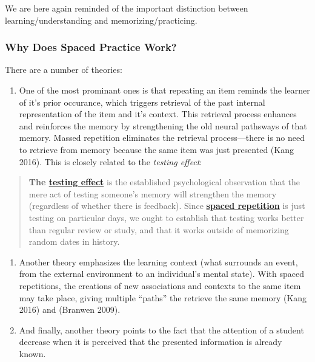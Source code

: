 We are here again reminded of the important distinction between
learning/understanding and memorizing/practicing.

\subsubsection{Why Does Spaced Practice
Work?}\label{why-does-spaced-practice-work}

There are a number of theories:

\begin{enumerate}
\def\labelenumi{\arabic{enumi}.}
\tightlist
\item
  One of the most prominant ones is that repeating an item reminds the
  learner of it's prior occurance, which triggers retrieval of the past
  internal representation of the item and it's context. This retrieval
  process enhances and reinforces the memory by strengthening the old
  neural pathsways of that memory. Massed repetition eliminates the
  retrieval process---there is no need to retrieve from memory because
  the same item was just presented (Kang 2016). This is closely related
  to the \emph{testing effect}:
\end{enumerate}

\begin{quote}
\textbf{The
\href{https://en.wikipedia.org/wiki/testing\%20effect}{testing effect}}
is the established psychological observation that the mere act of
testing someone's memory will strengthen the memory (regardless of
whether there is feedback). Since
\href{https://en.wikipedia.org/wiki/spaced\%20repetition}{\textbf{spaced
repetition}} is just testing on particular days, we ought to establish
that testing works better than regular review or study, and that it
works outside of memorizing random dates in history.
\end{quote}

\begin{enumerate}
\def\labelenumi{\arabic{enumi}.}
\setcounter{enumi}{1}
\tightlist
\item
  Another theory emphasizes the learning context (what surrounds an
  event, from the external environment to an individual's mental state).
  With spaced repetitions, the creations of new associations and
  contexts to the same item may take place, giving multiple ``paths''
  the retrieve the same memory (Kang 2016) and (Branwen 2009).
\item
  And finally, another theory points to the fact that the attention of a
  student decrease when it is perceived that the presented information
  is already known.
\end{enumerate}

